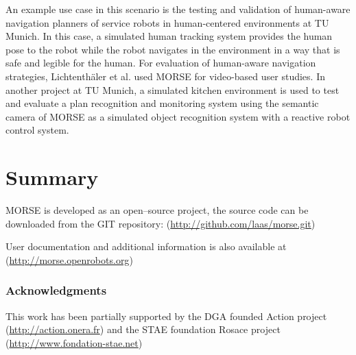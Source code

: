 \documentclass{llncs}
\begin{document}
An example use case in this scenario is the testing and validation of human-aware
navigation planners of service robots in human-centered environments at TU Munich. 
In this case, a simulated human tracking system provides the human pose to the robot
while the robot navigates in the environment in a way that is safe and legible
for the human. For evaluation of human-aware navigation strategies, 
Lichtenth{\"a}ler et al. \cite{lichtenthaeler2012increasing} used MORSE for 
video-based user studies. 
In another project at TU Munich, a simulated kitchen environment is used
to test and evaluate a plan recognition and monitoring system using the 
semantic camera of MORSE as a simulated object recognition system with 
a reactive robot control system.


\section{Summary}
\label{section:discussion}


MORSE is developed as an open--source project, the source code can be
downloaded from the GIT repository:
(\url{http://github.com/laas/morse.git})

User documentation and additional information is also available at
(\url{http://morse.openrobots.org})


\subsubsection*{Acknowledgments}
This work has been partially supported by the DGA founded Action project
(\url{http://action.onera.fr}) and the STAE foundation Rosace project\\
(\url{http://www.fondation-stae.net})



\end{document}
